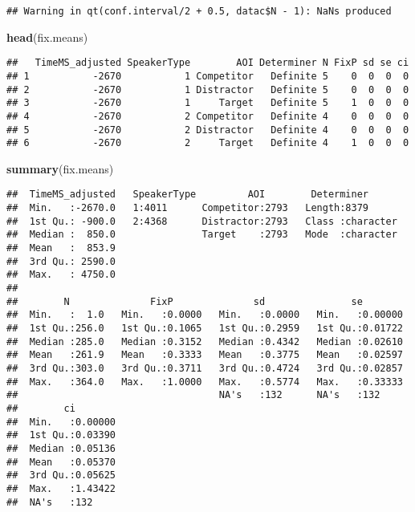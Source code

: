 \documentclass[
]{article}
\newenvironment{Shaded}{\begin{snugshade}}{\end{snugshade}}
\newcommand{\FunctionTok}[1]{\textcolor[rgb]{0.13,0.29,0.53}{\textbf{#1}}}
\newcommand{\NormalTok}[1]{#1}
\begin{document}
\begin{verbatim}
## Warning in qt(conf.interval/2 + 0.5, datac$N - 1): NaNs produced
\end{verbatim}

\begin{Shaded}
\begin{Highlighting}[]
\FunctionTok{head}\NormalTok{(fix.means)}
\end{Highlighting}
\end{Shaded}

\begin{verbatim}
##   TimeMS_adjusted SpeakerType        AOI Determiner N FixP sd se ci
## 1           -2670           1 Competitor   Definite 5    0  0  0  0
## 2           -2670           1 Distractor   Definite 5    0  0  0  0
## 3           -2670           1     Target   Definite 5    1  0  0  0
## 4           -2670           2 Competitor   Definite 4    0  0  0  0
## 5           -2670           2 Distractor   Definite 4    0  0  0  0
## 6           -2670           2     Target   Definite 4    1  0  0  0
\end{verbatim}

\begin{Shaded}
\begin{Highlighting}[]
\FunctionTok{summary}\NormalTok{(fix.means)}
\end{Highlighting}
\end{Shaded}

\begin{verbatim}
##  TimeMS_adjusted   SpeakerType         AOI        Determiner       
##  Min.   :-2670.0   1:4011      Competitor:2793   Length:8379       
##  1st Qu.: -900.0   2:4368      Distractor:2793   Class :character  
##  Median :  850.0               Target    :2793   Mode  :character  
##  Mean   :  853.9                                                   
##  3rd Qu.: 2590.0                                                   
##  Max.   : 4750.0                                                   
##                                                                    
##        N              FixP              sd               se         
##  Min.   :  1.0   Min.   :0.0000   Min.   :0.0000   Min.   :0.00000  
##  1st Qu.:256.0   1st Qu.:0.1065   1st Qu.:0.2959   1st Qu.:0.01722  
##  Median :285.0   Median :0.3152   Median :0.4342   Median :0.02610  
##  Mean   :261.9   Mean   :0.3333   Mean   :0.3775   Mean   :0.02597  
##  3rd Qu.:303.0   3rd Qu.:0.3711   3rd Qu.:0.4724   3rd Qu.:0.02857  
##  Max.   :364.0   Max.   :1.0000   Max.   :0.5774   Max.   :0.33333  
##                                   NA's   :132      NA's   :132      
##        ci         
##  Min.   :0.00000  
##  1st Qu.:0.03390  
##  Median :0.05136  
##  Mean   :0.05370  
##  3rd Qu.:0.05625  
##  Max.   :1.43422  
##  NA's   :132
\end{verbatim}
\end{document}
